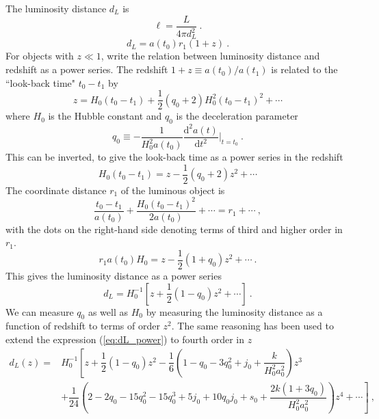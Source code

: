 \documentclass[12pt,a4paper]{article}
\newcommand{\dif}{\mathrm{d}}
\begin{document}
The luminosity distance $d_L$ is 
\begin{equation}
\ell = \dfrac{L}{4\pi d_L^2} ~.
\end{equation}
\begin{equation}
d_L = a(t_0) r_1 (1+z) ~.
\end{equation}
For objects with $z \ll 1$, write the relation between luminosity distance and redshift as a power series. The redshift $1+ z \equiv a(t_0)/a(t_1)$ is related to the ``look-back time" $t_0 - t_1$ by
\begin{equation}
z = H_0 (t_0 -t_1) + \dfrac{1}{2} (q_0 +2 ) H_0^2 (t_0 -t_1)^2 + \cdots 
\end{equation}
where $H_0$ is the Hubble constant and $q_0$ is the deceleration parameter
\begin{equation}
q_0 \equiv -\dfrac{1}{H_0^2 a(t_0)} \dfrac{\dif^2 a(t)}{\dif t^2} \Big|_{t=t_0} ~.
\end{equation}
This can be inverted, to give the look-back time as a power series in the redshift
\begin{equation}
H_0 (t_0 -t_1) = z - \dfrac{1}{2} (q_0 +2) z^2 +\cdots 
\end{equation}
The coordinate distance $r_1$ of the luminous object is 
\begin{equation}
\dfrac{t_0 -t_1}{a(t_0) } + \dfrac{H_0(t_0 -t_1)^2}{2a(t_0) }  + \cdots = r_1 + \cdots ~,
\end{equation}
with the dots on the right-hand side denoting terms of third and higher order in $r_1$.
\begin{equation}
r_1 a(t_0) H_0 = z - \dfrac{1}{2} (1+q_0) z^2 + \cdots ~.
\end{equation}
This gives the luminosity distance as a power series
\begin{equation}
d_L = H_0^{-1} \left[ z + \dfrac{1}{2} (1-q_0) z^2 + \cdots  \right] ~.
\label{eq:dL_power}
\end{equation}
We can measure $q_0$ as well as $H_0$ by measuring the luminosity distance as a function of redshift to terms of order $z^2$. The same reasoning has been used to extend the expression (\ref{eq:dL_power}) to fourth order in $z$
\begin{align}
\nonumber d_L(z) = & H_0^{-1} \left[z + \dfrac{1}{2} (1-q_0) z^2 - \dfrac{1}{6} \left(1-q_0 -3q_0^2 +j_0 +\dfrac{k}{H_0^2 a_0^2} \right) z^3  \right. \\
& \left.  +\dfrac{1}{24} \left(2-2q_0-15 q_0^2 -15q_0^3 +5j_0 +10 q_0 j_0 +s_0 + \dfrac{2k(1+3q_0)}{H_0^2 a_0^2} \right) z^4 +\cdots \right] ~,
\end{align}
\end{document}
